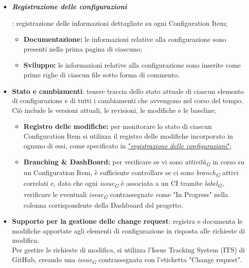 \begin{itemize}
    \item \hypertarget{item:registrazioneconfigurazioni}{\textit{\textbf{Registrazione delle configurazioni}}}: registrazione delle informazioni dettagliate su ogni Configuration Item;
          \begin{itemize}
              \item  \textbf{Documentazione:} le informazioni relative alla configurazione sono presenti nella prima pagina di ciascuno;
              \item  \textbf{Sviluppo:} le informazioni relative alla configurazione sono inserite come prime righe di ciascun file sotto forma di commento.
          \end{itemize}
    \item \textbf{Stato e cambiamenti}: tenere traccia dello stato attuale di ciascun elemento di configurazione e di tutti i cambiamenti che avvengono nel corso del tempo. \\
    Ciò include le versioni attuali, le revisioni, le modifiche e le baseline;
        \begin{itemize}
            \item \textbf{Registro delle modifiche:} per monitorare lo stato di ciascun Configuration Item si utilizza il registro delle modifiche incorporato in ognuno di essi, come specificato in \hyperlink{item:registrazioneconfigurazioni}{"\textit{registrazione delle configurazioni}"};
            \item \textbf{Branching \& DashBoard:} per verificare se vi sono \textit{attività}\textsubscript{\textit{G}} in corso su un Configuration Item, è sufficiente controllare se ci sono \textit{branch}\textsubscript{\textit{G}} attivi correlati e, dato che ogni \textit{issue}\textsubscript{\textit{G}} è associata a un CI tramite \textit{label}\textsubscript{\textit{G}}, verificare le eventuali \textit{issue}\textsubscript{\textit{G}} contrassegnate come "In Progress" nella colonna corrispondente della Dashboard del progetto.
        \end{itemize}
    \item \textbf{Supporto per la gestione delle change request}: registra e documenta le modifiche apportate agli elementi di configurazione in risposta alle richieste di modifica. \\
    Per gestire le richieste di modifica, si utilizza l'Issue Tracking System (ITS) di GitHub, creando una \textit{issue}\textsubscript{\textit{G}} contrassegnata con l'etichetta "Change request".
\end{itemize}

